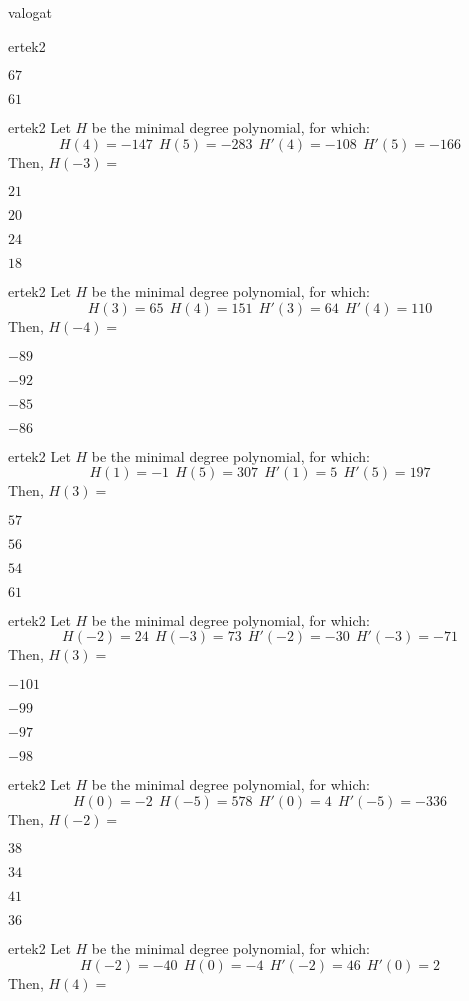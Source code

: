 \documentclass[12pt]{article}
\begin{document}
\begin{quiz}{valogat}
\begin{multi}{ertek2}
\item  $ 67 $
\item  $ 61 $
\end{multi}\begin{multi}{ertek2}
Let $H$ be the minimal degree polynomial, for which:
$$
H(4)=-147\ \ H(5)=-283 \ \ H'(4)=-108 \ \ H'(5)=-166
$$
Then, $H(-3)=$
\item* $ 21 $
\item  $ 20 $
\item  $ 24 $
\item  $ 18 $
\end{multi}\begin{multi}{ertek2}
Let $H$ be the minimal degree polynomial, for which:
$$
H(3)=65\ \ H(4)=151 \ \ H'(3)=64 \ \ H'(4)=110
$$
Then, $H(-4)=$
\item* $ -89 $
\item  $ -92 $
\item  $ -85 $
\item  $ -86 $
\end{multi}\begin{multi}{ertek2}
Let $H$ be the minimal degree polynomial, for which:
$$
H(1)=-1\ \ H(5)=307 \ \ H'(1)=5 \ \ H'(5)=197
$$
Then, $H(3)=$
\item* $ 57 $
\item  $ 56 $
\item  $ 54 $
\item  $ 61 $
\end{multi}\begin{multi}{ertek2}
Let $H$ be the minimal degree polynomial, for which:
$$
H(-2)=24\ \ H(-3)=73 \ \ H'(-2)=-30 \ \ H'(-3)=-71
$$
Then, $H(3)=$
\item* $ -101 $
\item  $ -99 $
\item  $ -97 $
\item  $ -98 $
\end{multi}\begin{multi}{ertek2}
Let $H$ be the minimal degree polynomial, for which:
$$
H(0)=-2\ \ H(-5)=578 \ \ H'(0)=4 \ \ H'(-5)=-336
$$
Then, $H(-2)=$
\item* $ 38 $
\item  $ 34 $
\item  $ 41 $
\item  $ 36 $
\end{multi}\begin{multi}{ertek2}
Let $H$ be the minimal degree polynomial, for which:
$$
H(-2)=-40\ \ H(0)=-4 \ \ H'(-2)=46 \ \ H'(0)=2
$$
Then, $H(4)=$

\end{multi}
\end{quiz}
\end{document}
